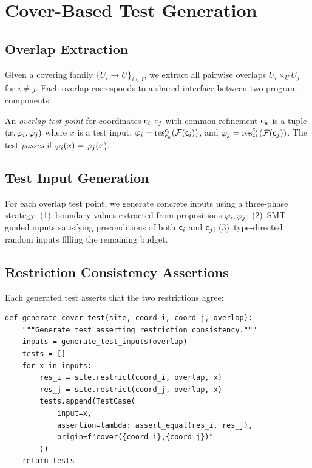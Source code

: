 \documentclass[11pt]{article}
\begin{document}
\section{Cover-Based Test Generation}\label{sec:cover-tests}

\subsection{Overlap Extraction}
Given a covering family $\{U_i \to U\}_{i \in I}$, we extract all pairwise
overlaps $U_i \times_U U_j$ for $i \neq j$.  Each overlap corresponds to a
shared interface between two program components.

\begin{definition}\label{def:overlap-test}
An \emph{overlap test point} for coordinates $\mathsf{c}_i, \mathsf{c}_j$ with
common refinement $\mathsf{c}_k$ is a tuple $(x, \varphi_i, \varphi_j)$ where $x$
is a test input, $\varphi_i = \mathrm{res}_{\mathsf{c}_k}^{\mathsf{c}_i}(\mathcal{F}(\mathsf{c}_i))$,
and $\varphi_j = \mathrm{res}_{\mathsf{c}_k}^{\mathsf{c}_j}(\mathcal{F}(\mathsf{c}_j))$.  The
test \emph{passes} if $\varphi_i(x) = \varphi_j(x)$.
\end{definition}

\subsection{Test Input Generation}
For each overlap test point, we generate concrete inputs using a three-phase
strategy: (1)~boundary values extracted from propositions $\varphi_i, \varphi_j$;
(2)~SMT-guided inputs satisfying preconditions of both $\mathsf{c}_i$ and
$\mathsf{c}_j$; (3)~type-directed random inputs filling the remaining budget.

\subsection{Restriction Consistency Assertions}
Each generated test asserts that the two restrictions agree:

\begin{lstlisting}[style=jugeo-python]
def generate_cover_test(site, coord_i, coord_j, overlap):
    """Generate test asserting restriction consistency."""
    inputs = generate_test_inputs(overlap)
    tests = []
    for x in inputs:
        res_i = site.restrict(coord_i, overlap, x)
        res_j = site.restrict(coord_j, overlap, x)
        tests.append(TestCase(
            input=x,
            assertion=lambda: assert_equal(res_i, res_j),
            origin=f"cover({coord_i},{coord_j})"
        ))
    return tests
\end{lstlisting}
\end{document}
